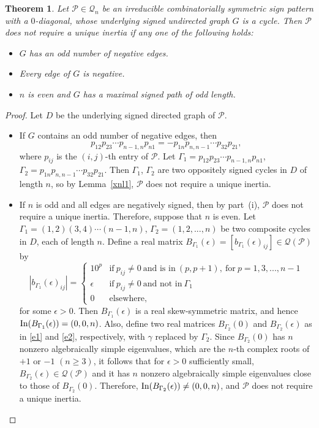 \documentclass[a4paper, 10pt]{article}
\newtheorem{theorem}{Theorem}[section]
\numberwithin{equation}{section}
\def\In{{\rm In}}
\begin{document}
\begin{theorem} \label{xxth3}
	Let $\mathcal{P} \in \mathcal{Q}_n$ be an irreducible combinatorially symmetric sign pattern with a $0$-diagonal, whose underlying signed undirected graph $G$ is a cycle. Then $\mathcal{P}$ does not require a unique inertia if any one of the following holds:
	\begin{itemize}
		\item[i.] $G$ has an odd number of negative edges. 
		\item[ii.] Every edge of $G$ is negative.
		\item[iii.] $n$ is even and $G$ has a maximal signed path of odd length.
	\end{itemize}
\end{theorem}

\begin{proof}
	Let $D$ be the underlying signed directed graph of $\mathcal{P}$.
	\begin{itemize}
		\item[i.]  If $G$ contains an odd number of negative edges, then
		$$p_{12}p_{23}\cdots p_{n-1,n} p_{n1}=-p_{1n}p_{n,n-1}\cdots p_{32} p_{21},$$ where $p_{ij}$ is the $(i,j)$-th entry of $\mathcal{P}$.
		Let $\Gamma_1 = p_{12}p_{23}\cdots p_{n-1,n} p_{n1}$, $\Gamma_2 = p_{1n}p_{n,n-1}\cdots p_{32} p_{21}$.
		Then $\Gamma_1$, $\Gamma_2$ are two oppositely signed cycles in $D$ of length $n$, so by Lemma~\ref{xnl1}, $\mathcal{P}$ does not require a unique inertia.
		
		\item[ii.] If $n$ is odd and all edges are negatively signed, then by part~(i), $\mathcal{P}$ does not require a unique inertia. Therefore, suppose that $n$ is even. Let 
		$\Gamma_1=(1,2)(3,4)\cdots (n-1,n)$, $\Gamma_2=(1,2,...,n)$ be two composite cycles in $D$, each of length $n$.  
		Define a real matrix $B_{\Gamma_1}(\epsilon) = [b_{\Gamma_1}(\epsilon)_{ij}] \in \mathcal{Q}(\mathcal{P})$ by
		\begin{equation*}
			|b_{\Gamma_1}(\epsilon)_{ij}|= \begin{cases}
				10^p & \text{if}\ p_{ij}\neq 0 ~\text{and~is~in}~ (p,p+1),~\text{for}~p=1,3,...,n-1 \\
				\epsilon & \text{if}\ p_{ij}\neq 0~\text{and~not~in}~ \Gamma_1 \\
				
				0 & \text{elsewhere,}
			\end{cases}
		\end{equation*}
		for some $\epsilon>0$. Then $B_{\Gamma_1}(\epsilon)$ is a real skew-symmetric matrix, and hence $\In(B_{\Gamma_1}(\epsilon))=(0,0,n)$. Also, define two real matrices $B_{\Gamma_2}(0)$ and $B_{\Gamma_2}(\epsilon)$ as in \eqref{e1} and \eqref{e2}, respectively, with $\gamma$ replaced by $\Gamma_2$. Since $B_{\Gamma_2}(0)$ has $n$ nonzero algebraically simple eigenvalues, which are the $n$-th complex roots of $+1$ or $-1$ $(n\geq 3)$, it follows that for $\epsilon > 0$ sufficiently small, $B_{\Gamma_2}(\epsilon)\in \mathcal{Q}(\mathcal{P})$ and it has $n$ nonzero algebraically simple eigenvalues close to those of $B_{\Gamma_2}(0)$. Therefore, $\In(B_{\Gamma_2}(\epsilon))\neq (0,0,n)$, and $\mathcal{P}$ does not require a unique inertia. 
		

\end{itemize}
\end{proof}
\end{document}
